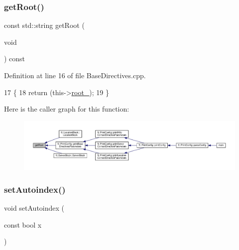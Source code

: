 \subsubsection{\texorpdfstring{get\+Root()}{getRoot()}}
{\footnotesize\ttfamily const std\+::string get\+Root (\begin{DoxyParamCaption}\item[{void}]{ }\end{DoxyParamCaption}) const\hspace{0.3cm}{\ttfamily [inherited]}}



Definition at line 16 of file Base\+Directives.\+cpp.


\begin{DoxyCode}
17     \{
18         \textcolor{keywordflow}{return} (this->\hyperlink{classft_1_1_base_directives_abb1eaf0bba10b90172d6152e69457dc7}{root\_});
19     \}
\end{DoxyCode}
Here is the caller graph for this function\+:
\nopagebreak
\begin{figure}[H]
\begin{center}
\leavevmode
\includegraphics[width=350pt]{classft_1_1_base_directives_aa5dbcb08bda0a0e7e502d2df7cf64287_icgraph}
\end{center}
\end{figure}
\mbox{\label{classft_1_1_base_directives_ae7293c7bbf34e9bdc60c540dccd53342}} 
\subsubsection{\texorpdfstring{set\+Autoindex()}{setAutoindex()}}
{\footnotesize\ttfamily void set\+Autoindex (\begin{DoxyParamCaption}\item[{const bool}]{x }\end{DoxyParamCaption})\hspace{0.3cm}{\ttfamily [inherited]}}




